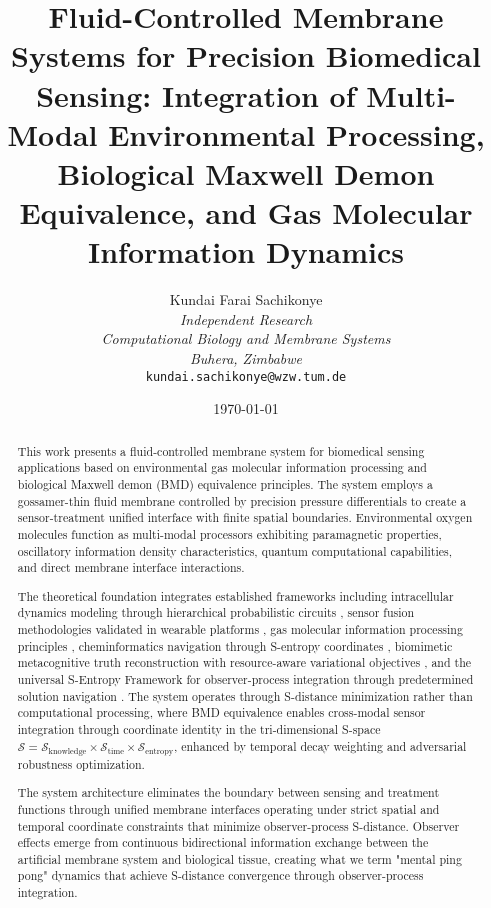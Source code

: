 \documentclass[12pt,a4paper]{article}
\title{\textbf{Fluid-Controlled Membrane Systems for Precision Biomedical Sensing: Integration of Multi-Modal Environmental Processing, Biological Maxwell Demon Equivalence, and Gas Molecular Information Dynamics}}
\author{
Kundai Farai Sachikonye\\
\textit{Independent Research}\\
\textit{Computational Biology and Membrane Systems}\\
\textit{Buhera, Zimbabwe}\\
\texttt{kundai.sachikonye@wzw.tum.de}
}
\date{\today}
\begin{document}
\maketitle

\begin{abstract}
This work presents a fluid-controlled membrane system for biomedical sensing applications based on environmental gas molecular information processing and biological Maxwell demon (BMD) equivalence principles. The system employs a gossamer-thin fluid membrane controlled by precision pressure differentials to create a sensor-treatment unified interface with finite spatial boundaries. Environmental oxygen molecules function as multi-modal processors exhibiting paramagnetic properties, oscillatory information density characteristics, quantum computational capabilities, and direct membrane interface interactions.

The theoretical foundation integrates established frameworks including intracellular dynamics modeling through hierarchical probabilistic circuits \cite{sachikonye2024intracellular}, sensor fusion methodologies validated in wearable platforms \cite{sachikonye2024sensor}, gas molecular information processing principles \cite{sachikonye2024perception}, cheminformatics navigation through S-entropy coordinates \cite{sachikonye2024borgia}, biomimetic metacognitive truth reconstruction with resource-aware variational objectives \cite{honjo2024masamune}, and the universal S-Entropy Framework for observer-process integration through predetermined solution navigation \cite{sachikonye2024stellas}. The system operates through S-distance minimization rather than computational processing, where BMD equivalence enables cross-modal sensor integration through coordinate identity in the tri-dimensional S-space $\mathcal{S} = \mathcal{S}_{\text{knowledge}} \times \mathcal{S}_{\text{time}} \times \mathcal{S}_{\text{entropy}}$, enhanced by temporal decay weighting and adversarial robustness optimization.

The system architecture eliminates the boundary between sensing and treatment functions through unified membrane interfaces operating under strict spatial and temporal coordinate constraints that minimize observer-process S-distance. Observer effects emerge from continuous bidirectional information exchange between the artificial membrane system and biological tissue, creating what we term "mental ping pong" dynamics that achieve S-distance convergence through observer-process integration.


\end{abstract}
\end{document}

